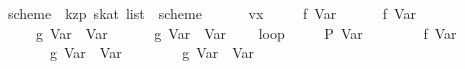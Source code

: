 \begin{isabellebody}
\ scheme{}\ {}{}\ {}kzp\ skat\ list{}\ \ {}scheme{}\ {}\isanewline
\ \ {}\ {}\ {}{}\ vx\isanewline
\ \ {}\ {}\ {}{}\ f\ {}Var\ {}{}\isanewline
\ \ {}\ {}\ {}{}\ f\ {}Var\ {}{}\isanewline
\ \ {}\ {}\ {}{}\ g\ {}Var\ {}{}\ {}Var\ {}{}\isanewline
\ \ {}\ {}\ {}{}\ g\ {}Var\ {}{}\ {}Var\ {}{}\isanewline
\ \ {}\ loop\isanewline
\ \ \ \ {}\ {}{}P\ {}Var\ {}{}{}\isanewline
\ \ \ \ {}\ {}\ {}{}\ f\ {}Var\ {}{}\isanewline
\ \ \ \ {}\ {}\ {}{}\ g\ {}Var\ {}{}\ {}Var\ {}{}\isanewline
\ \ \ \ {}\ {}\ {}{}\ g\ {}Var\ {}{}\ {}Var\ {}{}\isanewline

\end{isabellebody}
